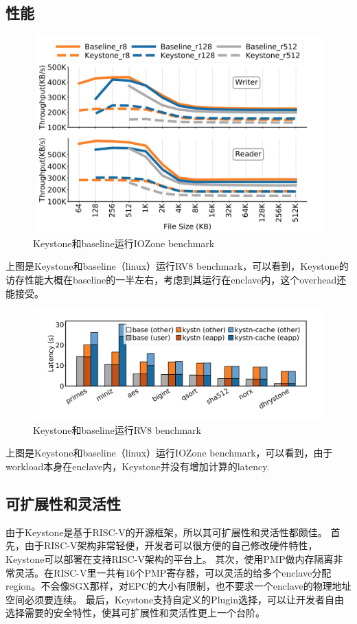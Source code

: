 \subsection{性能}
\begin{figure}[]
    \centering
    \includegraphics[width=1\textwidth]{memory-eval.png}    
    \caption{Keystone和baseline运行IOZone benchmark}
\end{figure}
上图是Keystone和baseline（linux）运行RV8 benchmark，可以看到，Keystone的访存性能大概在baseline的一半左右，考虑到其运行在enclave内，这个overhead还能接受。
\begin{figure}[]
    \centering
    \includegraphics[width=1\textwidth]{calculation-eval.png}    
    \caption{Keystone和baseline运行RV8 benchmark}
\end{figure}
上图是Keystone和baseline（linux）运行IOZone benchmark，可以看到，由于workload本身在enclave内，Keystone并没有增加计算的latency.
\subsection{可扩展性和灵活性}
由于Keystone是基于RISC-V的开源框架，所以其可扩展性和灵活性都颇佳。
首先，由于RISC-V架构非常轻便，开发者可以很方便的自己修改硬件特性，Keystone可以部署在支持RISC-V架构的平台上。
其次，使用PMP做内存隔离非常灵活。在RISC-V里一共有16个PMP寄存器，可以灵活的给多个enclave分配region。不会像SGX那样，对EPC的大小有限制，也不要求一个enclave的物理地址空间必须要连续。
最后，Keystone支持自定义的Plugin选择，可以让开发者自由选择需要的安全特性，使其可扩展性和灵活性更上一个台阶。

